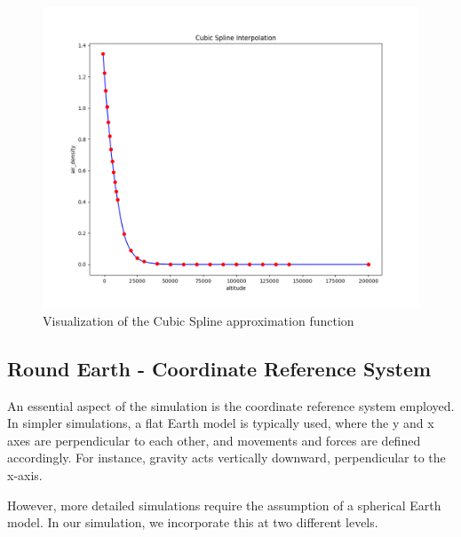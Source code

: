 \documentclass[runningheads]{llncs}
\begin{document}
\begin{figure}
\centering
\includegraphics[width=1\textwidth]{images/cubic-spline.png}
\caption{Visualization of the Cubic Spline approximation function} \label{cubic_spline}
\end{figure}













\subsection{Round Earth - Coordinate Reference System}

An essential aspect of the simulation is the coordinate reference system employed. In simpler simulations, a flat Earth model is typically used, where the y and x axes are perpendicular to each other, and movements and forces are defined accordingly. For instance, gravity acts vertically downward, perpendicular to the x-axis.

However, more detailed simulations require the assumption of a spherical Earth model. In our simulation, we incorporate this at two different levels.
\end{document}
